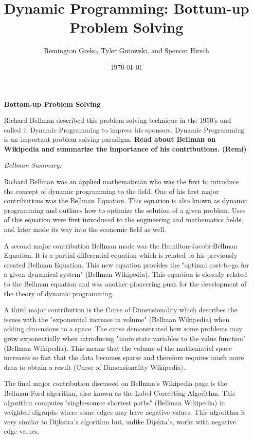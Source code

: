 \documentclass{article}
\begin{document}
\title{\textbf{Dynamic Programming: Bottum-up Problem Solving}}
\author{Remington Greko, Tyler Gutowski, and Spencer Hirsch}
\date{\today}

\maketitle

\noindent \textbf{Bottom-up Problem Solving} 


\noindent Richard Bellman described this problem solving technique in the
1950’s and called it Dynamic Programming to impress his sponsors.
Dynamic Programming is an important problem solving paradigm.
\textbf{Read about Bellman on Wikipedia and summarize the importance
of his contributions. (Remi)}

\noindent \textit{Bellman Summary:}

Richard Bellman was an applied mathematician who was the first to 
introduce the concept of dynamic programming to the field. One of
his first major contributions was the Bellman Equation. This equation 
is also known as dynamic programming and outlines how to optimize
the solution of a given problem. Uses of this equation were first 
introduced to the engineering and mathematics fields, and later
made its way into the economic field as well.

A second major contribution Bellman made was the Hamilton-Jacobi-Bellman
Equation. It is a partial differential equation which is related to his
previously created Bellman Equation. This new equation provides the 
"optimal cost-to-go for a given dynamical system" (Bellman Wikipedia).
This equation is closesly related to the Bellman equation and was another
pioneering push for the development of the theory of dynamic programming.

A third major contribution is the Curse of Dimensionality which describes 
the issues with the "exponential increase in volume" (Bellman Wikipedia)
when adding dimensions to a space. The curse demonstrated how some 
problems may grow exponentially when introducing "more state variables 
to the value function" (Bellman Wikipedia). This means that the volume
of the mathematicl space increases so fast that the data becomes sparse
and therefore requires much more data to obtain a result (Curse of
Dimensionality Wikipedia).

The final major contribution discussed on Bellman's Wikipedia page is 
the Bellman-Ford algorithm, also known as the Label Correcting Algorithm.
This algorithm computes "single-source shortest paths" (Bellman Wikipedia)
in weighted digraphs where some edges may have negative values. This 
algorithm is very similar to Dijkstra's algorithm but, unlike Dijskta's, 
works with negative edge values.
\end{document}
